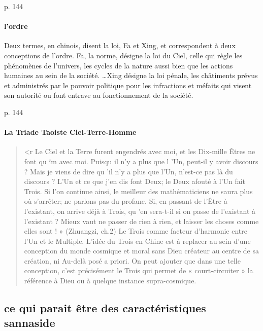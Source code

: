 \cite{PolDroit:voyage} p. 144 


\paragraph{l'ordre} Deux termes, en chinois, disent la loi, Fa et Xing, et correspondent à deux conceptions de l’ordre. Fa, la norme, désigne la loi du Ciel, celle qui règle les phénomènes de l’univers, les cycles de la nature aussi bien que les actions humaines au sein de la société. \ldots Xing désigne la loi pénale, les châtiments prévus et administrés par le pouvoir politique pour les infractions et méfaits qui visent son autorité ou font entrave au fonctionnement de la société.



\cite{PolDroit:voyage} p. 144 

\paragraph{La Triade Taoiste Ciel-Terre-Homme}
\begin{quote}
<r Le Ciel et la Terre furent engendrés avec moi, et les Dix-mille
Êtres ne font qu ïm avec moi. Puisqu il n'y a plus que l 'Un, peut-il
y avoir discours ? Mais je viens de dire qu 'il n'y a plus que l'Un,
n'est-ce pas là du discours ? L'Un et ce que j'en dis font Deux;
le Deux afouté à l'Un fait Trois. Si l'on continue ainsi, le meilleur
des mathématiciens ne saura plus où s'arrêter; ne parlons pas du
profane. Si, en passant de l'Être à l'existant, on arrive déjà à Trois,
qu 'en sera-t-il si on passe de l'existant à l'existant ? Mieux vaut ne
passer de rien à rien, et laisser les choses comme elles sont ! »
(Zhuangzi, ch.2)
Le Trois comme facteur d'harmonie entre l'Un et le Multiple. L'idée du Trois en Chine est à replacer au sein d'une conception
du monde cosmique et moral sans Dieu créateur au centre de sa
création, ni Au-delà posé a priori. On peut ajouter que dans une
telle conception, c'est précisément le Trois qui permet de « court-circuiter
» la référence à Dieu ou à quelque instance supra-cosmique. 
\end{quote}

\subsection{ce qui parait être des caractéristiques sannaside}

